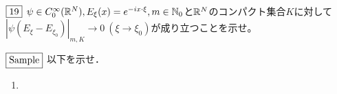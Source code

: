 \documentclass[dvipdfmx, leqno]{jsreport}
\begin{document}
\begin{tcolorbox}$\fbox{19}$
    $\psi\in C^\infty_0(\mathbb{R}^N), E_\xi(x)= e^{-ix\cdot \xi}, m\in \mathbb{N}_0$と$\mathbb{R}^N$のコンパクト集合$K$に対して$|\psi(E_\xi- E_{\xi_0})|_{m, K}\to 0\ (\xi\to \xi_0)$が成り立つことを示せ。
\end{tcolorbox}
\begin{tcolorbox}$\fbox{Sample}$
    以下を示せ．
\begin{enumerate}
    \item 
\end{enumerate}
\end{tcolorbox}
\end{document}
